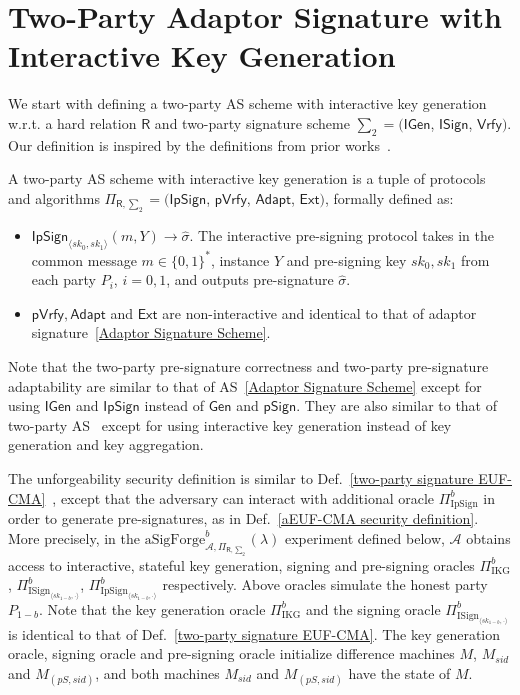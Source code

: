 \documentclass{llncs}
\begin{document}

\section{Two-Party Adaptor Signature with Interactive Key Generation}

We start with defining a two-party AS scheme with interactive key generation w.r.t. a hard relation $\mathsf{R}$ and two-party signature scheme $\sum_2=(\mathsf{IGen}$, $\mathsf{ISign}$, $\mathsf{Vrfy})$. Our definition is inspired by the definitions from prior works~\cite{Lin17,CCLST19,ErwigFHM021}. 

A two-party AS scheme with interactive key generation is a tuple of protocols and algorithms $\Pi_{\mathsf{R},\sum_2}=($$\mathsf{IpSign}$, $\mathsf{pVrfy}$, $\mathsf{Adapt}$, $\mathsf{Ext})$, formally defined as:

\begin{itemize}
\item $\mathsf{IpSign}_{\langle sk_0,sk_1\rangle}(m,Y) \rightarrow \hat{\sigma}$. The interactive pre-signing protocol takes in the common message $m\in\{0,1\}^*$, instance $Y$ and pre-signing key $sk_0,sk_1$ from each party $P_i$, $i=0,1$, and outputs pre-signature $\hat{\sigma}$.

\item $\mathsf{pVrfy}, \mathsf{Adapt}$ and $\mathsf{Ext}$ are non-interactive and identical to that of adaptor signature~\ref{Adaptor Signature Scheme}.
\end{itemize}
Note that the two-party pre-signature correctness and two-party pre-signature adaptability are similar to that of AS~\ref{Adaptor Signature Scheme} except for using $\mathsf{IGen}$ and $\mathsf{IpSign}$ instead of $\mathsf{Gen}$ and $\mathsf{pSign}$. They are also similar to that of two-party AS~\cite{ErwigFHM021} except for using interactive key generation instead of key generation and key aggregation.

The unforgeability security definition is similar to Def.~\ref{two-party signature EUF-CMA}~\cite{Lin17}, except that the adversary can interact with additional oracle $\Pi^b_{\text{IpSign}}$ in order to generate pre-signatures, as in Def.~\ref{aEUF-CMA security definition}. More precisely, in the $\text{aSigForge}^b_{\mathcal{A},\Pi_{\mathsf{R},\sum_2}}(\lambda)$ experiment defined below, $\mathcal{A}$ obtains access to interactive, stateful key generation, signing and pre-signing oracles $\Pi^b_{\text{IKG}}$, $\Pi^b_{\text{ISign}_{\langle sk_{1-b},\cdot \rangle}}$, $\Pi^b_{\text{IpSign}_{\langle sk_{1-b},\cdot \rangle}}$ respectively. Above oracles simulate the honest party $P_{1-b}$. Note that the key generation oracle $\Pi^b_{\text{IKG}}$ and the signing oracle $\Pi^b_{\text{ISign}_{\langle sk_{1-b},\cdot \rangle}}$ is identical to that of Def.~\ref{two-party signature EUF-CMA}. The key generation oracle, signing oracle and pre-signing oracle initialize difference machines $M$, $M_{sid}$ and $M_{(pS,sid)}$, and both machines $M_{sid}$ and $M_{(pS,sid)}$ have the state of $M$.
\end{document}
